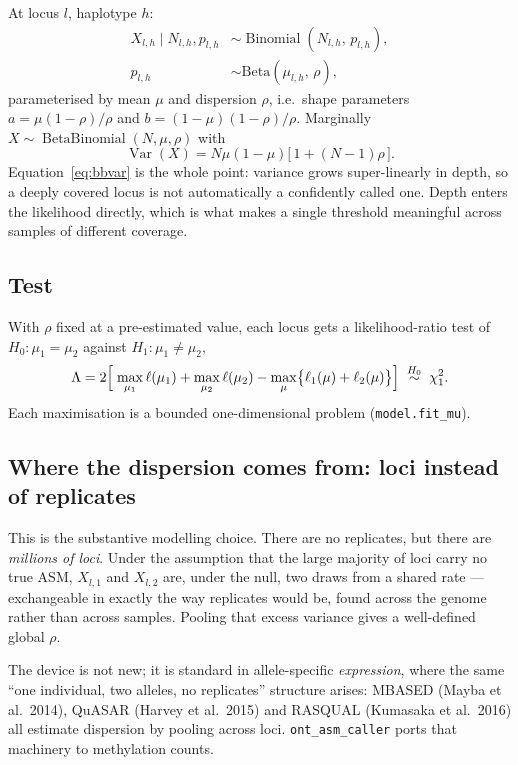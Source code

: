\documentclass[11pt]{article}
\DeclareMathOperator{\Var}{Var}
\DeclareMathOperator{\BetaBin}{BetaBinomial}
\DeclareMathOperator{\Bin}{Binomial}
\begin{document}
At locus $l$, haplotype $h$:
\begin{align}
X_{l,h} \mid N_{l,h}, p_{l,h} &\sim \Bin(N_{l,h},\, p_{l,h}), \\
p_{l,h} &\sim \mathrm{Beta}\!\left(\mu_{l,h},\, \rho\right),
\end{align}
parameterised by mean $\mu$ and dispersion $\rho$, i.e.\ shape parameters
$a = \mu(1-\rho)/\rho$ and $b = (1-\mu)(1-\rho)/\rho$. Marginally
$X \sim \BetaBin(N, \mu, \rho)$ with
\begin{equation}
\Var(X) = N\mu(1-\mu)\bigl[\,1 + (N-1)\rho\,\bigr].
\label{eq:bbvar}
\end{equation}
Equation~\eqref{eq:bbvar} is the whole point: variance grows super-linearly in
depth, so a deeply covered locus is not automatically a confidently called one.
Depth enters the likelihood directly, which is what makes a single threshold
meaningful across samples of different coverage.

\subsection{Test}

With $\rho$ fixed at a pre-estimated value, each locus gets a likelihood-ratio
test of $H_0\!: \mu_1 = \mu_2$ against $H_1\!: \mu_1 \neq \mu_2$,
\begin{equation}
\Lambda = 2\Bigl[\;\max_{\mu_1}\ell(\mu_1) + \max_{\mu_2}\ell(\mu_2)
- \max_{\mu}\bigl\{\ell_1(\mu) + \ell_2(\mu)\bigr\}\Bigr]
\;\overset{H_0}{\sim}\; \chi^2_1 .
\end{equation}
Each maximisation is a bounded one-dimensional problem
(\texttt{model.fit\_mu}).

\subsection{Where the dispersion comes from: loci instead of replicates}

This is the substantive modelling choice. There are no replicates, but there are
\emph{millions of loci}. Under the assumption that the large majority of loci
carry no true ASM, $X_{l,1}$ and $X_{l,2}$ are, under the null, two draws from a
shared rate --- exchangeable in exactly the way replicates would be, found across
the genome rather than across samples. Pooling that excess variance gives a
well-defined global $\rho$.

The device is not new; it is standard in allele-specific \emph{expression}, where
the same ``one individual, two alleles, no replicates'' structure arises: MBASED
(Mayba et al.\ 2014), QuASAR (Harvey et al.\ 2015) and RASQUAL (Kumasaka et al.\
2016) all estimate dispersion by pooling across loci. \texttt{ont\_asm\_caller}
ports that machinery to methylation counts.
\end{document}
